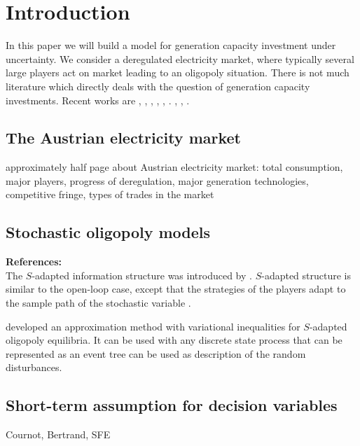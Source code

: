 \section{Introduction}

In this paper we will build a model for generation capacity investment under uncertainty. We consider a deregulated electricity market, where typically several large players act on market leading to an oligopoly situation. There is not much literature which directly deals with the question of  generation capacity investments. Recent works are \cite{Chuang2001}, \cite{Ventosa2002}, \cite{Chaton2003}, \cite{Hogendorn2003}, \cite{Pineau2003}, \cite{Ehrenmann2004}. \cite{Murphy2005}, \cite{Kiesling2007}, \cite{Pineau2007}.

\subsection{The Austrian electricity market}

approximately half page about Austrian electricity market: total consumption, major players, progress of deregulation, major generation technologies, competitive fringe, types of trades in the market


\subsection{Stochastic oligopoly models}

\textbf{References:} \cite{Salant1982, Wolf1997, Haurie2002, Pineau2003, Murto2004}\\


The $S$-adapted information structure was introduced by \cite{Haurie1990}.
$S$-adapted structure is similar to the open-loop case, except that the strategies of the players adapt to the sample path of the stochastic variable \citep[see][pg. 128]{Pineau2003}.

\cite{Haurie2002} developed an approximation method with variational inequalities for $S$-adapted oligopoly equilibria. It can be used with any discrete state process that can be represented as an event tree can be used as description of the random disturbances.

\subsection{Short-term assumption for decision variables}

Cournot, Bertrand, SFE


